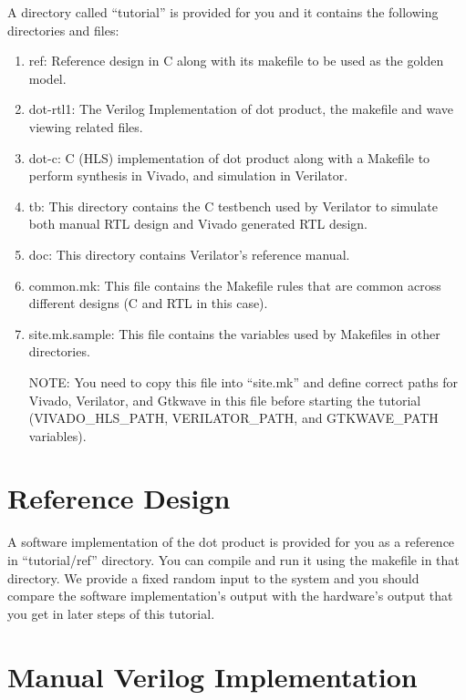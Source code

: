 \documentclass[12pt]{article}
\begin{document}
A directory called “tutorial” is provided for you and it contains the
following directories and files:

\begin{enumerate}

\item ref: Reference design in C along with its makefile to be used
    as the golden model.

\item dot-rtl1: The Verilog Implementation of dot product, the
    makefile and wave viewing related files.

\item dot-c: C (HLS) implementation of dot product along with a
  Makefile to perform synthesis in Vivado, and simulation in
  Verilator.

\item tb: This directory contains the C testbench used by Verilator to
  simulate both manual RTL design and Vivado generated RTL design.

\item doc: This directory contains Verilator’s reference manual.

\item common.mk: This file contains the Makefile rules that are common
  across different designs (C and RTL in this case).

\item site.mk.sample: This file contains the variables used by
  Makefiles in other directories.
  
NOTE: You need to copy this file into “site.mk” and define correct
paths for Vivado, Verilator, and Gtkwave in this file before starting
the tutorial (VIVADO\_HLS\_PATH, VERILATOR\_PATH, and GTKWAVE\_PATH
variables).

\end{enumerate}

\section{Reference Design}

A software implementation of the dot product is provided for you as a
reference in “tutorial/ref” directory. You can compile and run it
using the makefile in that directory. We provide a fixed random input
to the system and you should compare the software implementation’s
output with the hardware’s output that you get in later steps of this
tutorial.

\section{Manual Verilog Implementation}
\end{document}
